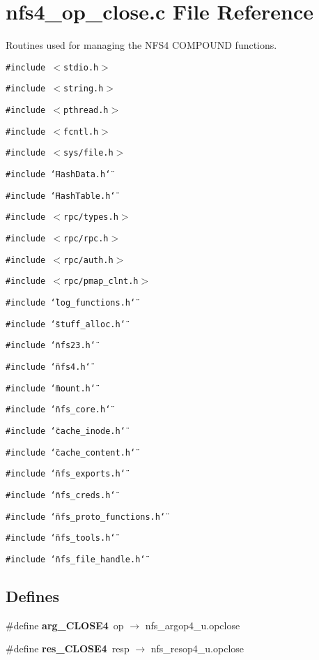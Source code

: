 \section{nfs4\_\-op\_\-close.c File Reference}
\label{nfs4__op__close_8c}
Routines used for managing the NFS4 COMPOUND functions. 

{\tt \#include $<$stdio.h$>$}\par
{\tt \#include $<$string.h$>$}\par
{\tt \#include $<$pthread.h$>$}\par
{\tt \#include $<$fcntl.h$>$}\par
{\tt \#include $<$sys/file.h$>$}\par
{\tt \#include \char`\"{}Hash\-Data.h\char`\"{}}\par
{\tt \#include \char`\"{}Hash\-Table.h\char`\"{}}\par
{\tt \#include $<$rpc/types.h$>$}\par
{\tt \#include $<$rpc/rpc.h$>$}\par
{\tt \#include $<$rpc/auth.h$>$}\par
{\tt \#include $<$rpc/pmap\_\-clnt.h$>$}\par
{\tt \#include \char`\"{}log\_\-functions.h\char`\"{}}\par
{\tt \#include \char`\"{}stuff\_\-alloc.h\char`\"{}}\par
{\tt \#include \char`\"{}nfs23.h\char`\"{}}\par
{\tt \#include \char`\"{}nfs4.h\char`\"{}}\par
{\tt \#include \char`\"{}mount.h\char`\"{}}\par
{\tt \#include \char`\"{}nfs\_\-core.h\char`\"{}}\par
{\tt \#include \char`\"{}cache\_\-inode.h\char`\"{}}\par
{\tt \#include \char`\"{}cache\_\-content.h\char`\"{}}\par
{\tt \#include \char`\"{}nfs\_\-exports.h\char`\"{}}\par
{\tt \#include \char`\"{}nfs\_\-creds.h\char`\"{}}\par
{\tt \#include \char`\"{}nfs\_\-proto\_\-functions.h\char`\"{}}\par
{\tt \#include \char`\"{}nfs\_\-tools.h\char`\"{}}\par
{\tt \#include \char`\"{}nfs\_\-file\_\-handle.h\char`\"{}}\par
\subsection*{Defines}
\begin{CompactItemize}
\item 
\#define {\bf arg\_\-CLOSE4}\ op $\rightarrow$ nfs\_\-argop4\_\-u.opclose
\item 
\#define {\bf res\_\-CLOSE4}\ resp $\rightarrow$ nfs\_\-resop4\_\-u.opclose
\end{CompactItemize}
